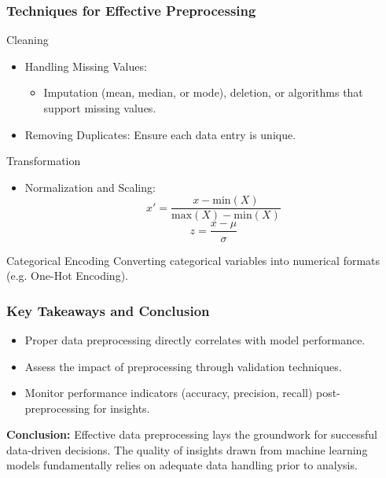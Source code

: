 \documentclass[aspectratio=169]{beamer}
\begin{document}
\begin{frame}[fragile]
    \frametitle{Techniques for Effective Preprocessing}
    \begin{block}{Cleaning}
        \begin{itemize}
            \item Handling Missing Values:
                \begin{itemize}
                    \item Imputation (mean, median, or mode), deletion, or algorithms that support missing values.
                \end{itemize}
            \item Removing Duplicates: Ensure each data entry is unique.
        \end{itemize}
    \end{block}
    
    \begin{block}{Transformation}
        \begin{itemize}
            \item Normalization and Scaling:
                \begin{equation}
                    x' = \frac{x - \text{min}(X)}{\text{max}(X) - \text{min}(X)}
                \end{equation}
                \begin{equation}
                    z = \frac{x - \mu}{\sigma}
                \end{equation}
        \end{itemize}
    \end{block}

    \begin{block}{Categorical Encoding}
        Converting categorical variables into numerical formats (e.g. One-Hot Encoding).
    \end{block}
\end{frame}

\begin{frame}[fragile]
    \frametitle{Key Takeaways and Conclusion}
    \begin{itemize}
        \item Proper data preprocessing directly correlates with model performance.
        \item Assess the impact of preprocessing through validation techniques.
        \item Monitor performance indicators (accuracy, precision, recall) post-preprocessing for insights.
    \end{itemize}
    
    \textbf{Conclusion:} Effective data preprocessing lays the groundwork for successful data-driven decisions. The quality of insights drawn from machine learning models fundamentally relies on adequate data handling prior to analysis.
\end{frame}
\end{document}

